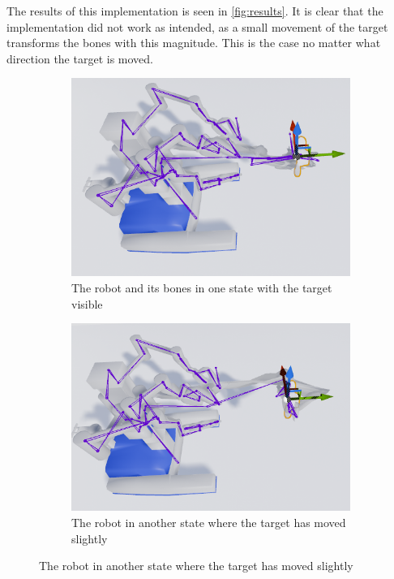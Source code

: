 The results of this implementation is seen in \autoref{fig:results}. It is clear that the implementation did not work as intended, as a small movement of the target transforms the bones with this magnitude. This is the case no matter what direction the target is moved. 


\begin{figure}[hbtp]
\begin{subfigure}[b]{0.48\textwidth}
\includegraphics[width=1\textwidth]{FABRIK/Robot_state1.PNG}
\caption{The robot and its bones in one state with the target visible}
\end{subfigure} 
\begin{subfigure}[b]{0.48\textwidth}
\includegraphics[width=1\textwidth]{FABRIK/Robot_state2.PNG}
\caption{The robot in another state where the target has moved slightly}
\end{subfigure}
\label{fig:results}
\end{figure}


